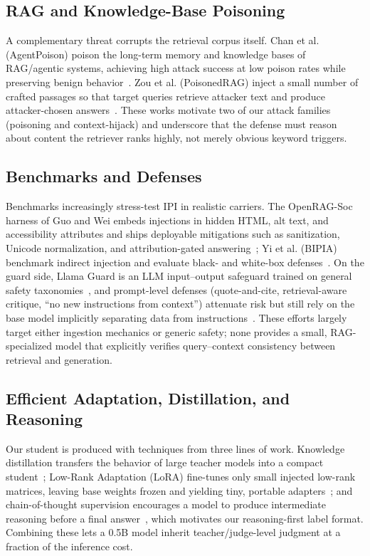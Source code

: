 \documentclass[11pt]{article}
\begin{document}
\subsection{RAG and Knowledge-Base Poisoning}
A complementary threat corrupts the retrieval corpus itself. Chan et al. (AgentPoison)
poison the long-term memory and knowledge bases of RAG/agentic systems, achieving high
attack success at low poison rates while preserving benign behavior~\cite{agentpoison}.
Zou et al. (PoisonedRAG) inject a small number of crafted passages so that target
queries retrieve attacker text and produce attacker-chosen answers~\cite{poisonedrag}.
These works motivate two of our attack families (\textsf{poisoning} and
\textsf{context-hijack}) and underscore that the defense must reason about content the
retriever ranks highly, not merely obvious keyword triggers.

\subsection{Benchmarks and Defenses}
Benchmarks increasingly stress-test IPI in realistic carriers. The OpenRAG-Soc
harness of Guo and Wei embeds injections in hidden HTML, alt text, and accessibility
attributes and ships deployable mitigations such as sanitization, Unicode
normalization, and attribution-gated answering~\cite{openragsoc}; Yi et al. (BIPIA) benchmark indirect injection
and evaluate black- and white-box defenses~\cite{bipia}. On the guard side, Llama
Guard is an LLM input--output safeguard trained on general safety
taxonomies~\cite{llamaguard}, and prompt-level defenses (quote-and-cite,
retrieval-aware critique, ``no new instructions from context'') attenuate risk but
still rely on the base model implicitly separating data from
instructions~\cite{openragsoc}. These efforts largely target either ingestion mechanics or
generic safety; none provides a small, RAG-specialized model that explicitly verifies
query--context consistency between retrieval and generation.

\subsection{Efficient Adaptation, Distillation, and Reasoning}
Our student is produced with techniques from three lines of work. Knowledge
distillation transfers the behavior of large teacher models into a compact
student~\cite{hinton}; Low-Rank Adaptation (LoRA) fine-tunes only small injected
low-rank matrices, leaving base weights frozen and yielding tiny, portable
adapters~\cite{lora}; and chain-of-thought supervision encourages a model to produce
intermediate reasoning before a final answer~\cite{cot}, which motivates our
reasoning-first label format. Combining these lets a 0.5B model inherit
teacher/judge-level judgment at a fraction of the inference cost.
\end{document}
